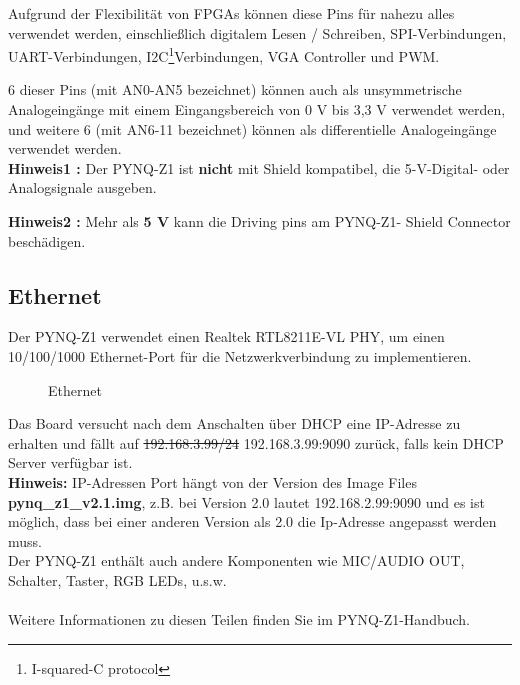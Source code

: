 \documentclass[a4paper]{report}
\begin{document}
Aufgrund der Flexibilität von FPGAs können diese Pins für nahezu alles verwendet werden, einschließlich digitalem Lesen / Schreiben, SPI-Verbindungen, UART-Verbindungen, I2C\footnote{I-squared-C protocol}Verbindungen, VGA Controller und PWM.

6 dieser Pins (mit AN0-AN5 bezeichnet) können auch als unsymmetrische Analogeingänge mit einem Eingangsbereich von 0 V bis 3,3 V verwendet werden, und weitere 6 (mit AN6-11 bezeichnet) können als differentielle Analogeingänge verwendet werden.\\

	\textbf{Hinweis1 :} Der PYNQ-Z1 ist \textbf{nicht} mit Shield kompatibel, die 5-V-Digital- oder Analogsignale ausgeben.
	
	\textbf{Hinweis2 :}  Mehr als \textbf{5 V} kann die Driving pins am PYNQ-Z1- Shield Connector beschädigen.



\subsection{Ethernet}
Der PYNQ-Z1 verwendet einen Realtek RTL8211E-VL PHY, um einen 10/100/1000 Ethernet-Port für die Netzwerkverbindung zu implementieren.

	\begin{figure}[H]
	\centering
	\caption{Ethernet}
	\label{fig:Ethernet}
	\end{figure}

Das Board versucht nach dem Anschalten über DHCP eine IP-Adresse zu erhalten und fällt auf \sout{192.168.3.99/24} 192.168.3.99:9090 zurück, falls kein DHCP Server verfügbar ist.\\

\textbf{Hinweis:} IP-Adressen Port hängt von der Version des Image Files \textbf{pynq{\_}z1{\_}v2.1.img}, z.B. bei Version 2.0 lautet 192.168.2.99:9090 und es ist möglich, dass bei einer anderen Version als 2.0 die Ip-Adresse angepasst werden muss.\\
	
Der PYNQ-Z1 enthält auch andere Komponenten wie MIC/AUDIO OUT, Schalter, Taster, RGB LEDs, u.s.w.\\\\
Weitere Informationen zu diesen Teilen finden Sie im PYNQ-Z1-Handbuch.
\end{document}
